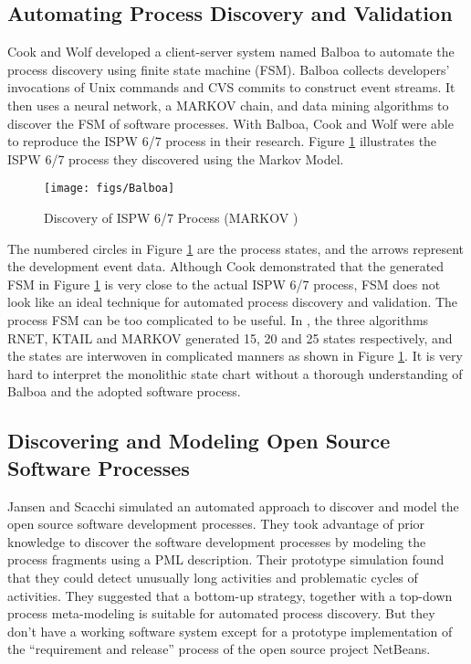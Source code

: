 \subsection{Automating Process Discovery and Validation}
Cook and Wolf \cite{Cook:95,Cook:96} developed a client-server 
system named Balboa to automate the process discovery using 
finite state machine (FSM). Balboa collects developers' 
invocations of Unix commands and CVS commits to construct
event streams. It then uses a neural network, a MARKOV chain, 
and data mining algorithms to discover 
the FSM of software processes. With Balboa, Cook and Wolf 
were able to reproduce the ISPW 6/7 process in their research. 
Figure \ref{fig:Balboa} illustrates the ISPW 6/7 process they 
discovered using the Markov Model.
\begin{figure}[htbp]
  \centering
  \texttt{[image: figs/Balboa]}
  \caption{Discovery of ISPW 6/7 Process (MARKOV )\cite{Cook:95}}
  \label{fig:Balboa}
\end{figure}
The numbered circles in Figure \ref{fig:Balboa} are the process 
states, and the arrows represent the development event data. 
Although Cook demonstrated that the generated FSM in Figure 
\ref{fig:Balboa} is very close to the actual ISPW 6/7 process, 
FSM does not look like an ideal technique for automated process
discovery and validation. The process FSM can be too complicated
to be useful. In \cite{Cook:95}, the three algorithms RNET, KTAIL
and MARKOV generated 15, 20 and 25 states respectively, and the 
states are interwoven in complicated manners as shown in Figure 
\ref{fig:Balboa}. It is very hard to interpret the monolithic 
state chart without a thorough understanding of Balboa and the 
adopted software process.

\begin{comment}
The FSM illustrated in Figure \ref{fig:Balboa} was generated 
from a event stream with only 32 events :
\mbox{ABCDCEFGHGIJGIKLMNOPRFGIKLMNOPQS}.
To discover the process hidden in this event steam, RNET 
took 10.4 hours, KTAIL took 29.4 seconds, and the MARKOV 
model used 0.6 seconds on a Sparc 2 Sun workstation. 
\end{comment}

\subsection{Discovering and Modeling Open Source Software Processes}
Jansen and Scacchi \cite{Jensen:04,Jensen:05} simulated an 
automated approach to discover and model the open source 
software development processes. They took advantage of prior 
knowledge to discover the software development processes by 
modeling the process fragments using a PML description. Their 
prototype simulation found that they could detect unusually 
long activities and problematic cycles of activities. They 
suggested that a bottom-up strategy, together with a top-down 
process meta-modeling is suitable for automated process 
discovery. But they don't have a working software system except 
for a prototype implementation of the ``requirement and 
release'' process of the open source project NetBeans.

